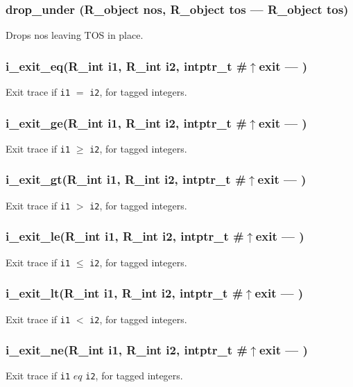 \subsubsection{drop\_under (R\_object nos, R\_object tos --- R\_object tos)}
\vspace{-1em}Drops nos leaving TOS in place. \vspace{-1em}
\subsubsection{i\_exit\_eq(R\_int i1, R\_int i2, intptr\_t \#$\uparrow$exit --- )}
\vspace{-1em}Exit trace if \texttt{i1} $=$ \texttt{i2}, for tagged integers. \vspace{-1em}
\subsubsection{i\_exit\_ge(R\_int i1, R\_int i2, intptr\_t \#$\uparrow$exit --- )}
\vspace{-1em}Exit trace if \texttt{i1} $\geq$ \texttt{i2}, for tagged integers. \vspace{-1em}
\subsubsection{i\_exit\_gt(R\_int i1, R\_int i2, intptr\_t \#$\uparrow$exit --- )}
\vspace{-1em}Exit trace if \texttt{i1} $>$ \texttt{i2}, for tagged integers. \vspace{-1em}
\subsubsection{i\_exit\_le(R\_int i1, R\_int i2, intptr\_t \#$\uparrow$exit --- )}
\vspace{-1em}Exit trace if \texttt{i1} $\leq$ \texttt{i2}, for tagged integers. \vspace{-1em}
\subsubsection{i\_exit\_lt(R\_int i1, R\_int i2, intptr\_t \#$\uparrow$exit --- )}
\vspace{-1em}Exit trace if \texttt{i1} $<$ \texttt{i2}, for tagged integers. \vspace{-1em}
\subsubsection{i\_exit\_ne(R\_int i1, R\_int i2, intptr\_t \#$\uparrow$exit --- )}
\vspace{-1em}Exit trace if \texttt{i1} $
eq$ \texttt{i2}, for tagged integers. \vspace{-1em}
